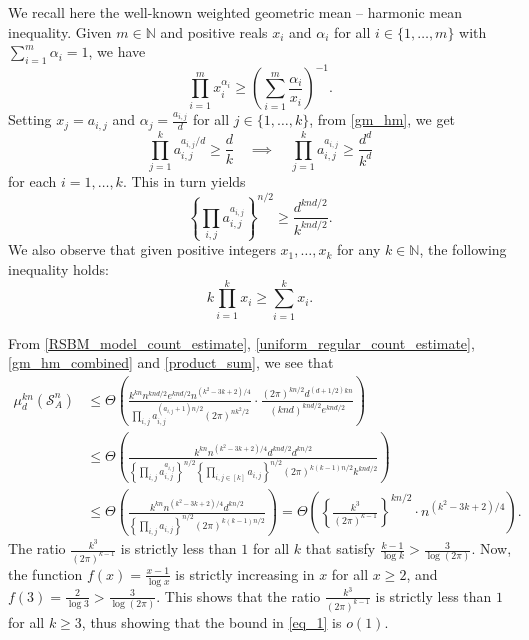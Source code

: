\documentclass[11pt,reqno]{amsart}
\theoremstyle{definition}
\theoremstyle{remark}
\theoremstyle{conjecture}
\begin{document}
We recall here the well-known weighted geometric mean -- harmonic mean inequality. Given $m \in \mathbb{N}$ and positive reals $x_{i}$ and $\alpha_{i} $ for all $i \in \{1, \ldots, m\}$ with $\sum_{i=1}^{m} \alpha_{i} = 1$, we have
\begin{equation}\label{gm_hm}
\prod_{i=1}^{m} x_{i}^{\alpha_{i}} \geqslant \left(\sum_{i=1}^{m} \frac{\alpha_{i}}{x_{i}}\right)^{-1}.
\end{equation}
Setting $x_{j} = a_{i,j}$ and $\alpha_{j} = \frac{a_{i,j}}{d}$ for all $j \in \{1, \ldots, k\}$, from \eqref{gm_hm}, we get
\begin{equation}%
\prod_{j=1}^{k} a_{i,j}^{a_{i,j}/d} \geqslant \frac{d}{k} \quad \implies \quad \prod_{j=1}^{k} a_{i,j}^{a_{i,j}} \geqslant \frac{d^{d}}{k^{d}} \nonumber
\end{equation}
for each $i = 1, \ldots, k$. This in turn yields
\begin{equation}\label{gm_hm_combined}
\left\{\prod_{i, j} a_{i,j}^{a_{i,j}}\right\}^{n/2} \geqslant \frac{d^{k n d/2}}{k^{k n d/2}}.
\end{equation}
We also observe that given positive integers $x_{1}, \ldots, x_{k}$ for any $k \in \mathbb{N}$, the following inequality holds:
\begin{equation}\label{product_sum}
k \prod_{i=1}^{k} x_{i} \geqslant \sum_{i=1}^{k} x_{i}.
\end{equation}

From \eqref{RSBM_model_count_estimate}, \eqref{uniform_regular_count_estimate}, \eqref{gm_hm_combined} and \eqref{product_sum}, we see that
\begin{align}\label{eq_1}
\mu^{kn}_{d}\left(\mathcal{S}^{n}_{A}\right) &\leqslant \Theta\left(\frac{k^{k n} n^{k n d/2} e^{k n d/2} n^{(k^{2} - 3k + 2)/4}}{\prod_{i, j} a_{i,j}^{(a_{i,j}+1)n/2} (2\pi)^{nk^{2}/2}} \cdot \frac{(2 \pi)^{k n/2} d^{(d+1/2)k n}}{(k n d)^{k n d/2} e^{k n d/2}}\right) \nonumber\\
&\leqslant \Theta\left(\frac{k^{k n} n^{(k^{2}-3k+2)/4} d^{k n d/2} d^{k n/2}}{\left\{\prod_{i, j} a_{i,j}^{a_{i,j}}\right\}^{n/2} \left\{\prod_{i, j \in [k]} a_{i,j}\right\}^{n/2} (2 \pi)^{k(k-1)n/2} k^{k n d/2}}\right) \nonumber\\
&\leqslant \Theta\left(\frac{k^{k n} n^{(k^{2}-3k+2)/4} d^{k n/2}}{\left\{\prod_{i, j} a_{i,j}\right\}^{n/2} (2 \pi)^{k(k-1)n/2}}\right)
= \Theta\left(\left\{\frac{k^{3}}{(2 \pi)^{k-1}}\right\}^{k n/2} \cdot n^{(k^{2}-3k+2)/4}\right).
\end{align} 
The ratio $\frac{k^{3}}{(2 \pi)^{k-1}}$ is strictly less than $1$ for all $k$ that satisfy $\frac{k-1}{\log k} > \frac{3}{\log (2\pi)}$. Now, the function $f(x) = \frac{x-1}{\log x}$ is strictly increasing in $x$ for all $x \geqslant 2$, and $f(3) = \frac{2}{\log 3} > \frac{3}{\log (2\pi)}$. This shows that the ratio $\frac{k^{3}}{(2 \pi)^{k-1}}$ is strictly less than $1$ for all $k \geqslant 3$, thus showing that the bound in \eqref{eq_1} is $o(1)$.
\end{document}
